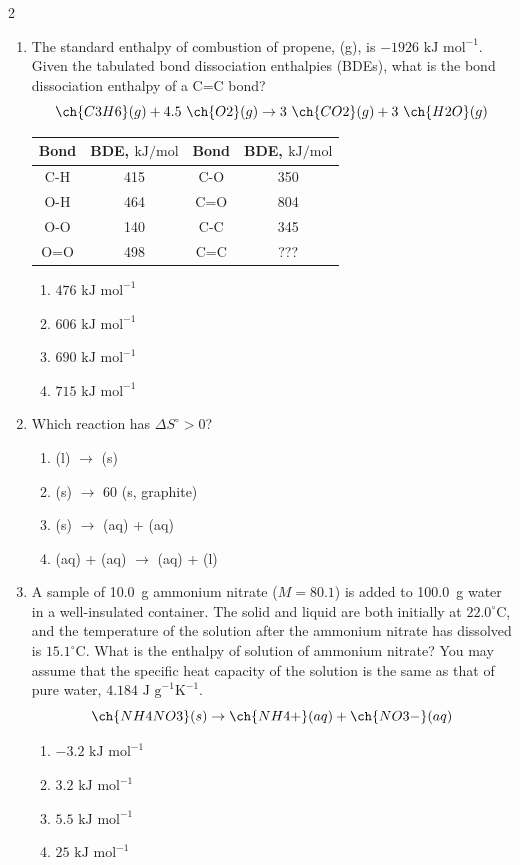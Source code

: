 \documentclass[titlepage,10pt,letterpaper]{article}
\begin{document}
\begin{multicols}{2}
\begin{enumerate}[leftmargin=*,resume]
\item The standard enthalpy of combustion of propene, (g), is $-1926\text{ kJ mol}^{-1}$. Given the tabulated bond dissociation enthalpies (BDEs), what is the bond dissociation enthalpy of a C=C bond?
\[ \ch{C3H6}(g) + 4.5\ \ch{O2}(g) \rightarrow 3\ \ch{CO2}(g) + 3\ \ch{H2O}(g) \]
\begin{center}
\small
\setlength{\tabcolsep}{2pt}
\begin{tabular}{cc|cc}
\toprule
Bond & BDE, $\text{kJ/mol}$ & Bond & BDE, $\text{kJ/mol}$ \\
\midrule
C-H & 415 & C-O & 350 \\
O-H & 464 & C=O & 804 \\
O-O & 140 & C-C & 345 \\
O=O & 498 & C=C & ??? \\
\bottomrule
\end{tabular}
\end{center}
\begin{enumerate}[label=(\alph*)]
    \item $476\text{ kJ mol}^{-1}$
    \item $606\text{ kJ mol}^{-1}$
    \item $690\text{ kJ mol}^{-1}$
    \item $715\text{ kJ mol}^{-1}$
\end{enumerate}

\item Which reaction has $\Delta S^\circ > 0$?
\begin{enumerate}[label=(\alph*)]
    \item {}(l) $\rightarrow$ (s)
    \item {}(s) $\rightarrow$ 60 (s, graphite)
    \item {}(s) $\rightarrow$ (aq) + (aq)
    \item {}(aq) + (aq) $\rightarrow$ (aq) + (l)
\end{enumerate}

\item A sample of 10.0~g ammonium nitrate ($M=80.1$) is added to 100.0~g water in a well-insulated container. The solid and liquid are both initially at $22.0^\circ\text{C}$, and the temperature of the solution after the ammonium nitrate has dissolved is $15.1^\circ\text{C}$. What is the enthalpy of solution of ammonium nitrate? You may assume that the specific heat capacity of the solution is the same as that of pure water, $4.184\text{ J g}^{-1}\text{K}^{-1}$.
\[ \ch{NH4NO3}(s) \rightarrow \ch{NH4+}(aq) + \ch{NO3-}(aq) \]
\begin{enumerate}[label=(\alph*)]
    \item $-3.2\text{ kJ mol}^{-1}$
    \item $3.2\text{ kJ mol}^{-1}$
    \item $5.5\text{ kJ mol}^{-1}$
    \item $25\text{ kJ mol}^{-1}$
\end{enumerate}


\end{enumerate}
\end{multicols}
\end{document}

